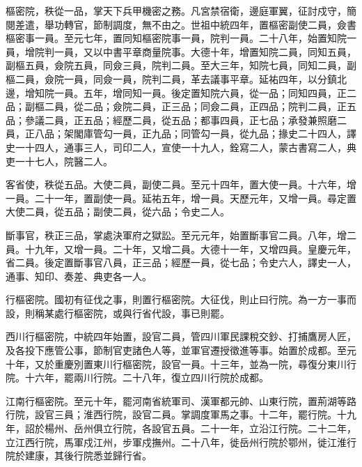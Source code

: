 
\begin{pinyinscope}

 樞密院，秩從一品，掌天下兵甲機密之務。凡宮禁宿衛，邊庭軍翼，征討戍守，簡閱差遣，舉功轉官，節制調度，無不由之。世祖中統四年，置樞密副使二員，僉書樞密事一員。至元七年，置同知樞密院事一員，院判一員。二十八年，始置知院一員，增院判一員，又以中書平章商量院事。大德十年，增置知院二員，同知五員，副樞五員，僉院五員，同僉三員，院判二員。至大三年，知院七員，同知二員，副樞二員，僉院一員，同僉一員，院判二員，革去議事平章。延祐四年，以分鎮北邊，增知院一員。五年，增同知一員。後定置知院六員，從一品；同知四員，正二品；副樞二員，從二品；僉院二員，正三品；同僉二員，正四品；院判二員，正五品；參議二員，正五品；經歷二員，從五品；都事四員，正七品；承發兼照磨二員，正八品；架閣庫管勾一員，正九品；同管勾一員，從九品；掾史二十四人，譯史一十四人，通事三人，司印二人，宣使一十九人，銓寫二人，蒙古書寫二人，典吏一十七人，院醫二人。



 客省使，秩從五品。大使二員，副使二員。至元十四年，置大使一員。十六年，增一員。二十一年，置副使一員。延祐五年，增一員。天歷元年，又增一員。尋定置大使二員，從五品；副使二員，從六品；令史二人。



 斷事官，秩正三品，掌處決軍府之獄訟。至元元年，始置斷事官二員。八年，增二員。十九年，又增一員。二十年，又增二員。大德十一年，又增四員。皇慶元年，省二員。後定置斷事官八員，正三品；經歷一員，從七品；令史六人，譯史一人，通事、知印、奏差、典吏各一人。



 行樞密院。國初有征伐之事，則置行樞密院。大征伐，則止曰行院。為一方一事而設，則稱某處行樞密院，或與行省代設，事已則罷。



 西川行樞密院，中統四年始置，設官二員，管四川軍民課稅交鈔、打捕鷹房人匠，及各投下應管公事，節制官吏諸色人等，並軍官遷授徵進等事。始置於成都。至元十年，又於重慶別置東川行樞密院，設官一員。十三年，並為一院，尋復分東川行院。十六年，罷兩川行院。二十八年，復立四川行院於成都。



 江南行樞密院。至元十年，罷河南省統軍司、漢軍都元帥、山東行院，置荊湖等路行院，設官三員；淮西行院，設官二員。掌調度軍馬之事。十二年，罷行院。十九年，詔於楊州、岳州俱立行院，各設官五員。二十一年，立沿江行院。二十二年，立江西行院，馬軍戍江州，步軍戍撫州。二十八年，徙岳州行院於鄂州，徙江淮行院於建康，其後行院悉並歸行省。




\end{pinyinscope}
